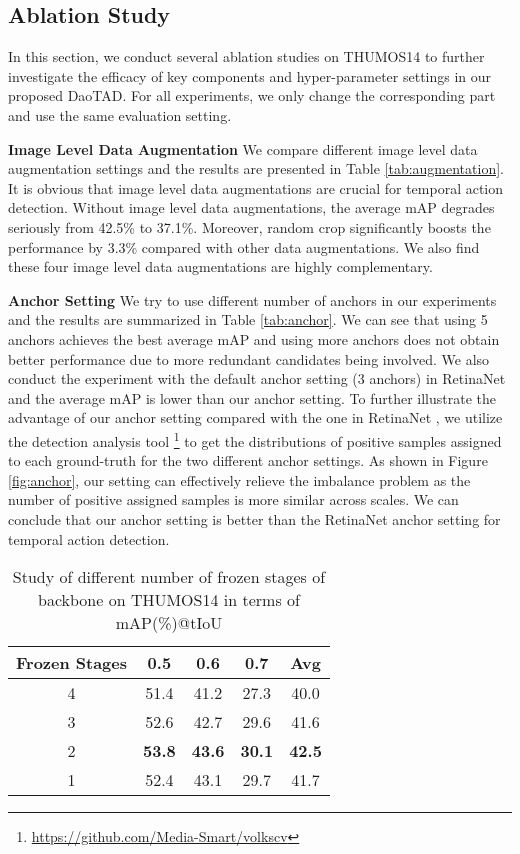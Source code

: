 \documentclass[final]{cvpr}
\begin{document}
\subsection{Ablation Study}
In this section, we conduct several ablation studies on THUMOS14 \cite{jiang2014thumos} to further investigate the efficacy of key components and hyper-parameter settings in our proposed DaoTAD. For all experiments, we only change the corresponding part and use the same evaluation setting.

\textbf{Image Level Data Augmentation}
We compare different image level data augmentation settings and the results are presented in Table \ref{tab:augmentation}. It is obvious that image level data augmentations are crucial for temporal action detection. Without image level data augmentations, the average mAP degrades seriously from 42.5\% to 37.1\%. Moreover, random crop significantly boosts the performance by 3.3\% compared with other data augmentations. We also find these four image level data augmentations are highly complementary.

\textbf{Anchor Setting}
We try to use different number of anchors in our experiments and the results are summarized in Table \ref{tab:anchor}. We can see that using 5 anchors achieves the best average mAP and using more anchors does not obtain better performance due to more redundant candidates being involved. We also conduct the experiment with the default anchor setting (3 anchors) in RetinaNet \cite{lin2017focal} and the average mAP is lower than our anchor setting. To further illustrate the advantage of our anchor setting compared with the one in RetinaNet \cite{lin2017focal}, we utilize the detection analysis tool \footnote{\url{https://github.com/Media-Smart/volkscv}} to get the distributions of positive samples assigned to each ground-truth for the two different anchor settings. As shown in Figure \ref{fig:anchor}, our setting can effectively relieve the imbalance problem as the number of positive assigned samples is more similar across scales. We can conclude that our anchor setting is better than the RetinaNet anchor setting for temporal action detection.

\begin{table}[htbp]
    \caption{Study of different number of frozen stages of backbone on THUMOS14 in terms of mAP(\%)@tIoU}
    \centering
    \begin{tabular}{ c | c c c c }
        \toprule
        Frozen Stages & 0.5 & 0.6 & 0.7 & Avg \\
        \midrule
        4 & 51.4 & 41.2 & 27.3 & 40.0 \\
        3 & 52.6 & 42.7 & 29.6 & 41.6 \\
        2 & \textbf{53.8} & \textbf{43.6} & \textbf{30.1} & \textbf{42.5} \\
        1 & 52.4 & 43.1 & 29.7 & 41.7 \\
        \bottomrule
    \end{tabular}
    \label{tab:frozen}
\end{table}
\end{document}
